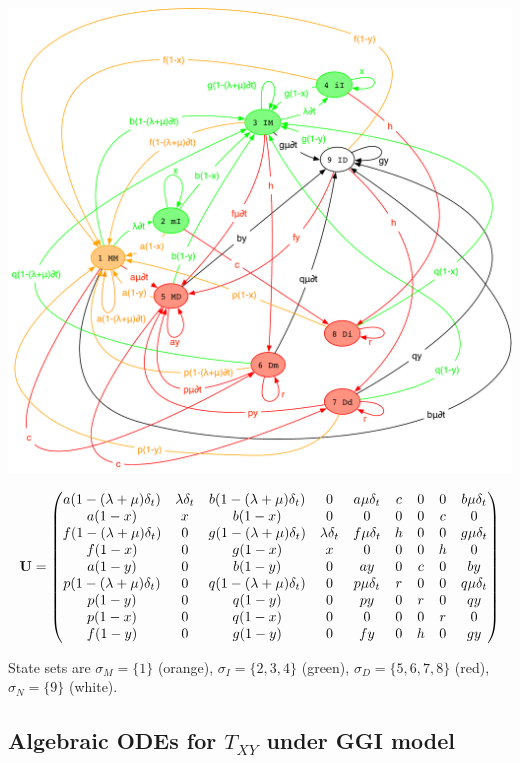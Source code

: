 \documentclass{article}
\begin{document}
\includegraphics[width=\textwidth]{PairInstant.pdf}

\[
 {\bf U} =
  \begin{pmatrix}
a (1-(\lambda+\mu) \delta_t) & \lambda \delta_t & b (1-(\lambda+\mu) \delta_t) & 0 & a \mu \delta_t & c & 0 & 0 & b \mu \delta_t \\
a (1-x) & x & b (1-x) & 0 & 0 & 0 & 0 & c & 0 \\
f (1-(\lambda+\mu) \delta_t) & 0 & g (1-(\lambda+\mu) \delta_t) & \lambda \delta_t & f \mu \delta_t & h & 0 & 0 & g \mu \delta_t \\
f (1-x) & 0 & g (1-x) & x & 0 & 0 & 0 & h & 0 \\
a (1-y) & 0 & b (1-y) & 0 & a y & 0 & c & 0 & b y \\
p (1-(\lambda+\mu) \delta_t) & 0 & q (1-(\lambda+\mu) \delta_t) & 0 & p \mu \delta_t & r & 0 & 0 & q \mu \delta_t \\
p (1-y) & 0 & q (1-y) & 0 & p y & 0 & r & 0 & q y \\
p (1-x) & 0 & q (1-x) & 0 & 0 & 0 & 0 & r & 0 \\
f (1-y) & 0 & g (1-y) & 0 & f y & 0 & h & 0 & g y    
  \end{pmatrix}
\]

State sets are
$\sigma_M=\{1\}$ (orange),
$\sigma_I=\{2,3,4\}$ (green),
$\sigma_D=\{5,6,7,8\}$ (red),
$\sigma_N=\{9\}$ (white).
  
\subsection{Algebraic ODEs for $T_{XY}$ under GGI model}
\end{document}
